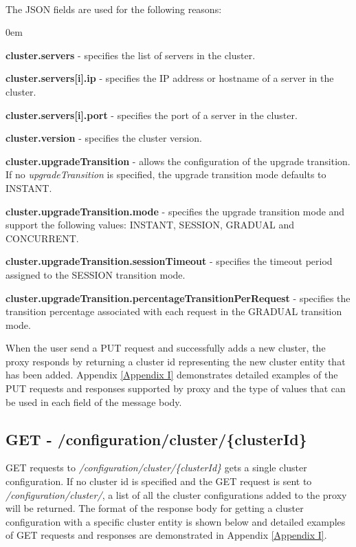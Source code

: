 \documentclass[a4paper,11pt,twoside]{report}
\begin{document}
\noindent\\
The JSON fields are used for the following reasons:

\begin{list}{-}{}
  \itemsep0em
  \item\textbf{{cluster.servers}} - specifies the list of servers in the cluster.
  
  \item\textbf{{cluster.servers[i].ip}} - specifies the IP address or hostname of a server in the cluster.
  
  \item\textbf{{cluster.servers[i].port}} - specifies the port of a server in the cluster.
  
  \item\textbf{{cluster.version}} - specifies the cluster version. 
  
  \item\textbf{{cluster.upgradeTransition}} - allows the configuration of the upgrade transition. If no \textit{upgradeTransition} is specified, the upgrade transition mode defaults to INSTANT.  
  
  \item\textbf{{cluster.upgradeTransition.mode}} - specifies the upgrade transition mode and support the following values: INSTANT, SESSION, GRADUAL and CONCURRENT.
   
  \item\textbf{{cluster.upgradeTransition.sessionTimeout}} - specifies the timeout period assigned to the SESSION transition mode.
  
  \item\textbf{{cluster.upgradeTransition.percentageTransitionPerRequest}} - specifies the transition percentage associated with each request in the GRADUAL transition mode.
\end{list}

\noindent
When the user send a PUT request and successfully adds a new cluster, the proxy responds by returning a cluster id representing the new cluster entity that has been added. Appendix \ref{Appendix  I} demonstrates detailed examples of the PUT requests and responses supported by proxy and the type of values that can be used in each field of the message body.

\subsection{GET - /configuration/cluster/\{clusterId\}} 
GET requests to \textit{/configuration/cluster/\{clusterId\}} gets a single cluster configuration. If no cluster id is specified and the GET request is sent to \textit{/configuration/cluster/}, a list of all the cluster configurations added to the proxy will be returned. The format of the response body for getting a cluster configuration with a specific cluster entity is shown below and detailed examples of GET requests and responses are demonstrated in Appendix \ref{Appendix  I}.\bigskip
\end{document}
